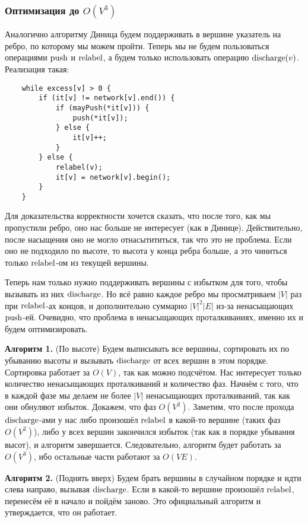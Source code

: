 \subsubsection{Оптимизация до $O(V^3)$}
Аналогично алгоритму Диница будем поддерживать в вершине указатель на ребро, по которому мы можем пройти.
Теперь мы не будем пользоваться операциями $\operatorname{push}$ и $\operatorname{relabel}$, а будем только использовать операцию $\operatorname{discharge}(v)$.
Реализация такая:
\begin{verbatim}
    while excess[v] > 0 {
        if (it[v] != network[v].end()) {
            if (mayPush(*it[v])) {
                push(*it[v]);
            } else {
                it[v]++;
            }
        } else {
            relabel(v);
            it[v] = network[v].begin();
        }
    }
\end{verbatim}
Для доказательства корректности хочется сказать, что после того, как мы пропустили ребро, оно нас больше не интересует (как в Динице).
Действительно, после насыщения оно не могло отнасытититься, так что это не проблема.
Если оно не подходило по высоте, то высота у конца ребра больше, а это чиниться только $\operatorname{relabel}$-ом из текущей вершины.

Теперь нам только нужно поддерживать вершины с избытком для того, чтобы вызывать из них $\operatorname{discharge}$.
Но всё равно каждое ребро мы просматриваем $|V|$ раз при $\operatorname{relabel}$-ах концов, и дополнительно суммарно $|V|^2|E|$ из-за ненасыщающих $\operatorname{push}$-ей.
Очевидно, что проблема в ненасыщающих проталкиваниях, именно их и будем оптимизировать.

\textbf{Алгоритм 1.} (По высоте) Будем выписывать все вершины, сортировать их по убыванию высоты и вызывать $\operatorname{discharge}$ от всех вершин в этом порядке.
Сортировка работает за $O(V)$, так как можно подсчётом.
Нас интересует только количество ненасыщающих проталкиваний и количество фаз.
Начнём с того, что в каждой фазе мы делаем не более $|V|$ ненасыщающих проталкиваний, так как они обнуляют избыток.
Докажем, что фаз $O(V^2)$.
Заметим, что после прохода $\operatorname{discharge}$-ами у нас либо произошёл $\operatorname{relabel}$ в какой-то вершине (таких фаз $O(V^2)$), либо у всех вершин закончился избыток (так как в порядке убывания высот), и алгоритм завершается.
Следовательно, алгоритм будет работать за $O(V^3)$, ибо остальные части работают за $O(VE)$.

\textbf{Алгоритм 2.} (Поднять вверх) Будем брать вершины в случайном порядке и идти слева направо, вызывая $\operatorname{discharge}$.
Если в какой-то вершине произошёл $\operatorname{relabel}$, перенесём её в начало и пойдём заново.
Это официальный алгоритм и утверждается, что он работает.

